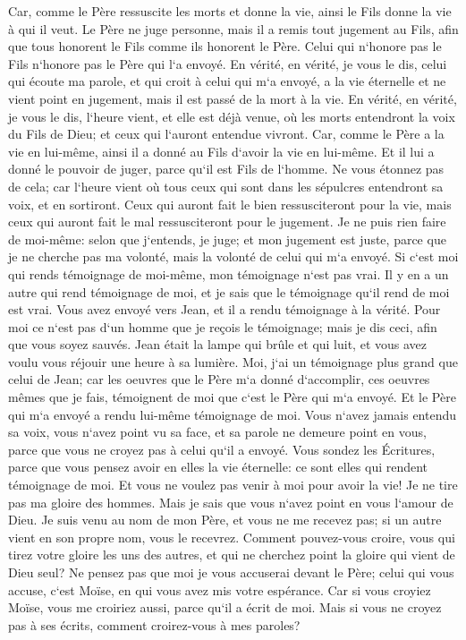\verse Car, comme le Père ressuscite les morts et donne la vie, ainsi le Fils donne la vie à qui il veut. 
\verse Le Père ne juge personne, mais il a remis tout jugement au Fils, 
\verse afin que tous honorent le Fils comme ils honorent le Père. Celui qui n`honore pas le Fils n`honore pas le Père qui l`a envoyé. 
\verse En vérité, en vérité, je vous le dis, celui qui écoute ma parole, et qui croit à celui qui m`a envoyé, a la vie éternelle et ne vient point en jugement, mais il est passé de la mort à la vie. 
\verse En vérité, en vérité, je vous le dis, l`heure vient, et elle est déjà venue, où les morts entendront la voix du Fils de Dieu; et ceux qui l`auront entendue vivront. 
\verse Car, comme le Père a la vie en lui-même, ainsi il a donné au Fils d`avoir la vie en lui-même. 
\verse Et il lui a donné le pouvoir de juger, parce qu`il est Fils de l`homme. 
\verse Ne vous étonnez pas de cela; car l`heure vient où tous ceux qui sont dans les sépulcres entendront sa voix, et en sortiront. 
\verse Ceux qui auront fait le bien ressusciteront pour la vie, mais ceux qui auront fait le mal ressusciteront pour le jugement. 
\verse Je ne puis rien faire de moi-même: selon que j`entends, je juge; et mon jugement est juste, parce que je ne cherche pas ma volonté, mais la volonté de celui qui m`a envoyé. 
\verse Si c`est moi qui rends témoignage de moi-même, mon témoignage n`est pas vrai. 
\verse Il y en a un autre qui rend témoignage de moi, et je sais que le témoignage qu`il rend de moi est vrai. 
\verse Vous avez envoyé vers Jean, et il a rendu témoignage à la vérité. 
\verse Pour moi ce n`est pas d`un homme que je reçois le témoignage; mais je dis ceci, afin que vous soyez sauvés. 
\verse Jean était la lampe qui brûle et qui luit, et vous avez voulu vous réjouir une heure à sa lumière. 
\verse Moi, j`ai un témoignage plus grand que celui de Jean; car les oeuvres que le Père m`a donné d`accomplir, ces oeuvres mêmes que je fais, témoignent de moi que c`est le Père qui m`a envoyé. 
\verse Et le Père qui m`a envoyé a rendu lui-même témoignage de moi. Vous n`avez jamais entendu sa voix, vous n`avez point vu sa face, 
\verse et sa parole ne demeure point en vous, parce que vous ne croyez pas à celui qu`il a envoyé. 
\verse Vous sondez les Écritures, parce que vous pensez avoir en elles la vie éternelle: ce sont elles qui rendent témoignage de moi. 
\verse Et vous ne voulez pas venir à moi pour avoir la vie! 
\verse Je ne tire pas ma gloire des hommes. 
\verse Mais je sais que vous n`avez point en vous l`amour de Dieu. 
\verse Je suis venu au nom de mon Père, et vous ne me recevez pas; si un autre vient en son propre nom, vous le recevrez. 
\verse Comment pouvez-vous croire, vous qui tirez votre gloire les uns des autres, et qui ne cherchez point la gloire qui vient de Dieu seul? 
\verse Ne pensez pas que moi je vous accuserai devant le Père; celui qui vous accuse, c`est Moïse, en qui vous avez mis votre espérance. 
\verse Car si vous croyiez Moïse, vous me croiriez aussi, parce qu`il a écrit de moi. 
\verse Mais si vous ne croyez pas à ses écrits, comment croirez-vous à mes paroles? 

